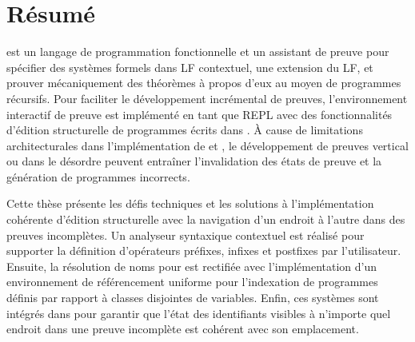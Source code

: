 
\chapter*{Résumé}
\vspace{-2em}

\Beluga est un langage de programmation fonctionnelle et un assistant de preuve pour spécifier des systèmes formels dans \acs{LF} contextuel, une extension du \acl{LF}, et prouver mécaniquement des théorèmes à propos d'eux au moyen de programmes récursifs.
Pour faciliter le développement incrémental de preuves, l'environnement interactif de preuve \Harpoon est implémenté en tant que \acl{REPL} avec des fonctionnalités d'édition structurelle de programmes écrits dans \Beluga.
À cause de limitations architecturales dans l'implémentation de \Beluga et \Harpoon, le développement de preuves vertical ou dans le désordre peuvent entraîner l'invalidation des états de preuve et la génération de programmes incorrects.

Cette thèse présente les défis techniques et les solutions à l'implémentation cohérente d'édition structurelle avec la navigation d'un endroit à l'autre dans des preuves incomplètes.
Un analyseur syntaxique contextuel est réalisé pour supporter la définition d'opérateurs préfixes, infixes et postfixes par l'utilisateur.
Ensuite, la résolution de noms pour \Beluga est rectifiée avec l'implémentation d'un environnement de référencement uniforme pour l'indexation de programmes définis par rapport à classes disjointes de variables.
Enfin, ces systèmes sont intégrés dans \Harpoon pour garantir que l'état des identifiants visibles à n'importe quel endroit dans une preuve incomplète est cohérent avec son emplacement.
